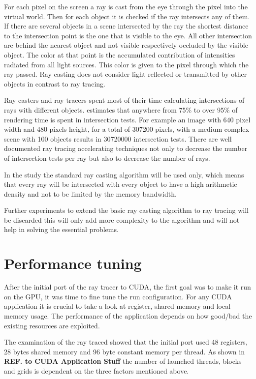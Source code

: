 For each pixel on the screen a ray is cast from the eye through the pixel into
the virtual world. Then for each object it is checked if the ray intersects any
of them. If there are several objects in a scene intersected by the ray the
shortest distance to the intersection point is the one that is visible to the
eye. All other intersection are behind the nearest object and not visible
respectively occluded by the visible object. The color at that point is the
accumulated contribution of intensities radiated from all light sources. This
color is given to the pixel through which the ray passed. Ray casting does not
consider light reflected or transmitted by other objects in contrast to ray
tracing.

Ray casters and ray tracers spent most of their time calculating intersections
of rays with different objects. \citeauthor{Whitted80} \citep{Whitted80} estimates
that anywhere from 75\% to over 95\% of rendering time is spent in
intersection tests. For example an image with 640 pixel width and 480 pixels
height, for a total of 307200 pixels, with a medium complex scene with 100
objects results in 30720000 intersection tests. There are well documented ray
tracing accelerating techniques not only to decrease the number of intersection
tests per ray but also to decrease the number of rays.

In the study the standard ray casting algorithm will be used only, which means
that every ray will be intersected with every object to have a high arithmetic
density and not to be limited by the memory bandwidth.

Further experiments to extend the basic ray casting algorithm to ray tracing 
will be discarded this will only add more complexity to the algorithm and will
not help in solving the essential problems. 

\section{Performance tuning} %
\label{sec:performance_tuning}

After the initial port of the ray tracer to \gls{CUDA}, the first goal was to 
make it run on the \gls{GPU}, it was time to fine tune the run configuration. 
For any \gls{CUDA} application it is crucial to take a look at register, shared 
memory and local memory usage. The performance of the application  depends on
how good/bad the existing resources are exploited.

The examination of the ray traced showed that the initial port used 48
registers, 28 bytes shared memory and 96 byte constant memory per thread. As
shown in \textbf{REF. to \gls{CUDA} Application Stuff} the number of launched threads,
blocks and grids is dependent on the three factors mentioned above.

